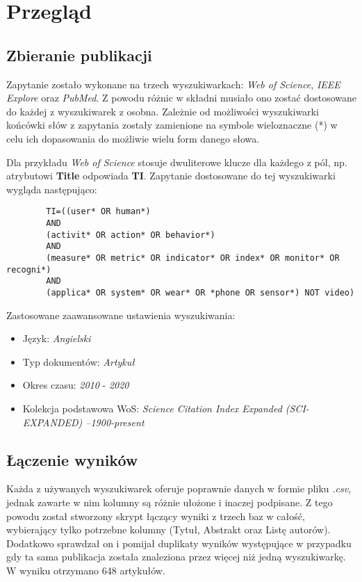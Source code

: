 \section{Przegląd}

\subsection{Zbieranie publikacji}
Zapytanie zostało wykonane na trzech wyszukiwarkach: \textit{Web of Science}, \textit{IEEE Explore} oraz \textit{PubMed}. Z powodu różnic w składni musiało ono zostać dostosowane do każdej z wyszukiwarek z osobna. Zależnie od możliwości wyszukiwarki końcówki słów z zapytania zostały zamienione na symbole wieloznaczne (*) w celu ich dopasowania do możliwie wielu form danego słowa.

Dla przykładu \textit{Web of Science} stosuje dwuliterowe klucze dla każdego z pól, np. atrybutowi {\bf Title} odpowiada {\bf TI}. Zapytanie dostosowane do tej wyszukiwarki wygląda następująco:
\begin{center}
	\begin{minipage}{0.85\linewidth}
		\begin{verbatim}
		TI=((user* OR human*) 
		AND 
		(activit* OR action* OR behavior*)
		AND 
		(measure* OR metric* OR indicator* OR index* OR monitor* OR recogni*) 
		AND 
		(applica* OR system* OR wear* OR *phone OR sensor*) NOT video)
		\end{verbatim}
	\end{minipage}
\end{center}
Zastosowane zaawansowane ustawienia wyszukiwania:
\begin{itemize}
    \item Język: {\it Angielski}
    \item Typ dokumentów: {\it Artykuł}
    \item Okres czasu: {\it 2010} - {\it 2020}
    \item Kolekcja podstawowa WoS: {\it Science Citation Index Expanded (SCI-EXPANDED) --1900-present}
\end{itemize}

\subsection{Łączenie wyników}
Każda z używanych wyszukiwarek oferuje poprawnie danych w formie pliku {\it .csv}, jednak zawarte w nim kolumny są różnie ułożone i inaczej podpisane. Z tego powodu został stworzony skrypt łączący wyniki z trzech baz w całość, wybierający tylko potrzebne kolumny (Tytuł, Abstrakt oraz Listę autorów). Dodatkowo sprawdzał on i pomijał duplikaty wyników występujące w przypadku gdy ta sama publikacja została znaleziona przez więcej niż jedną wyszukiwarkę. W wyniku otrzymano 648 artykułów.

